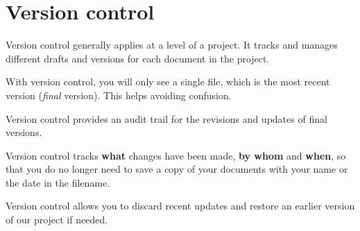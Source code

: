 \documentclass[
  letterpaper,
  DIV=11,
  numbers=noendperiod]{scrreprt}
\begin{document}
\hypertarget{version-control}{%
\section{Version control}\label{version-control}}

Version control generally applies at a level of a project. It tracks and
manages different drafts and versions for each document in the project.

\begin{tcolorbox}[enhanced jigsaw, colframe=quarto-callout-important-color-frame, colback=white, rightrule=.15mm, bottomrule=.15mm, left=2mm, arc=.35mm, coltitle=black, title=\textcolor{quarto-callout-important-color}{\faExclamation}\hspace{0.5em}{Important}, opacitybacktitle=0.6, bottomtitle=1mm, opacityback=0, toptitle=1mm, toprule=.15mm, colbacktitle=quarto-callout-important-color!10!white, titlerule=0mm, leftrule=.75mm, breakable]
With version control, you will only see a single file, which is the most
recent version (\emph{final} version). This helps avoiding confusion.
\end{tcolorbox}

Version control provides an audit trail for the revisions and updates of
final versions.

\begin{tcolorbox}[enhanced jigsaw, colframe=quarto-callout-tip-color-frame, colback=white, rightrule=.15mm, bottomrule=.15mm, left=2mm, arc=.35mm, coltitle=black, title=\textcolor{quarto-callout-tip-color}{\faLightbulb}\hspace{0.5em}{Tip}, opacitybacktitle=0.6, bottomtitle=1mm, opacityback=0, toptitle=1mm, toprule=.15mm, colbacktitle=quarto-callout-tip-color!10!white, titlerule=0mm, leftrule=.75mm, breakable]
Version control tracks \textbf{what} changes have been made, \textbf{by
whom} and \textbf{when}, so that you do no longer need to save a copy of
your documents with your name or the date in the filename.
\end{tcolorbox}

Version control allows you to discard recent updates and restore an
earlier version of our project if needed.
\end{document}

